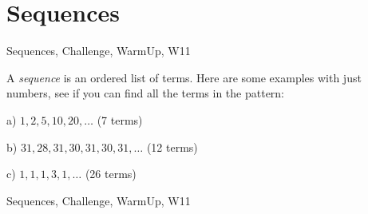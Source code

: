 \section{Sequences}

\begin{tagblock}{Sequences, Challenge, WarmUp, W11}
\begin{question}

A \textit{sequence} is an ordered list of terms. Here are some examples with just numbers, see if you can find all the terms in the pattern:

\bigskip

a) $1,2,5,10,20,\dots$ (7 terms)
 
\bigskip

b) $31,28,31,30,31,30,31,\dots$ (12 terms)

\bigskip

c) $1,1,1,3,1,\dots$ (26 terms)

	
	
\begin{tags}
	    Sequences, Challenge, WarmUp, W11
\end{tags}
	
\begin{diary}
	   
\end{diary}
	
\begin{solution}	

\end{solution}
	
\end{question}

\end{tagblock}




